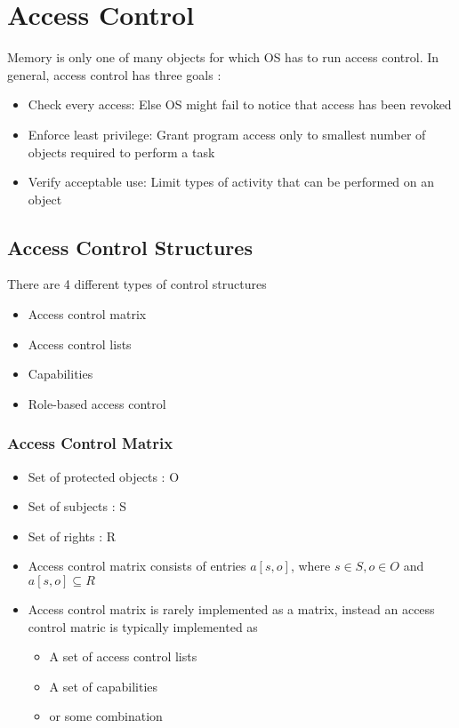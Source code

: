 \documentclass[twoside]{article}
\begin{document}
\section{Access Control}
Memory is only one of many objects for which OS has to run access control. In general, access control has three goals :
\begin{itemize}
\item Check every access: Else OS might fail to notice that
access has been revoked
\item Enforce least privilege: Grant program access only to
smallest number of objects required to perform a task
\item Verify acceptable use: Limit types of activity that can be performed on an object
\end{itemize}

\subsection{Access Control Structures}
There are 4 different types of control structures
\begin{itemize}
\item Access control matrix
\item Access control lists
\item Capabilities
\item Role-based access control
\end{itemize}

\subsubsection{Access Control Matrix}
\begin{itemize}
\item Set of protected objects : O
\item Set of subjects : S
\item Set of rights : R
\item Access control matrix consists of entries \(a[s,o]\), where \(s \in S, o \in O\) and \(a[s,o] \subseteq R\)
\item Access control matrix is rarely implemented as a matrix, instead an access control matric is typically implemented as 
\begin{itemize}
\item A set of access control lists
\item A set of capabilities 
\item or some combination
\end{itemize}
\end{itemize}
\end{document}
